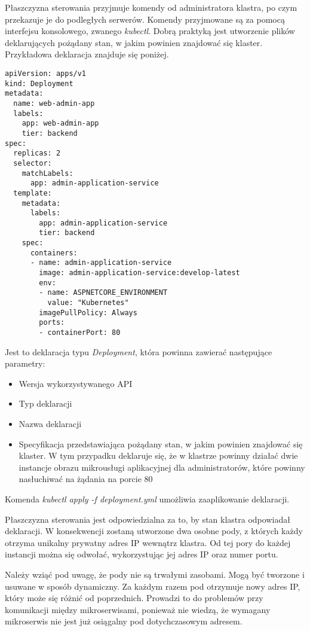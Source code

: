 Płaszczyzna sterowania przyjmuje komendy od administratora klastra, po czym przekazuje 
je do podległych serwerów. Komendy przyjmowane są za pomocą interfejsu 
konsolowego, zwanego \textit{kubectl}. Dobrą praktyką jest utworzenie plików deklarujących 
pożądany stan, w jakim powinien znajdować się klaster. Przykładowa deklaracja znajduje 
się poniżej.

\begin{lstlisting}
apiVersion: apps/v1
kind: Deployment
metadata:
  name: web-admin-app
  labels:
    app: web-admin-app
    tier: backend
spec:
  replicas: 2
  selector:
    matchLabels:
      app: admin-application-service
  template:
    metadata:
      labels:
        app: admin-application-service
        tier: backend
    spec:
      containers:
      - name: admin-application-service
        image: admin-application-service:develop-latest
        env:
        - name: ASPNETCORE_ENVIRONMENT
          value: "Kubernetes"
        imagePullPolicy: Always
        ports:
        - containerPort: 80
\end{lstlisting}

Jest to deklaracja typu \textit{Deployment}, która powinna zawierać następujące parametry:

\begin{itemize} %
    \item Wersja wykorzystywanego API
    \item Typ deklaracji
    \item Nazwa deklaracji
    \item Specyfikacja przedstawiająca pożądany stan, w jakim powinien znajdować się 
    klaster. W tym przypadku deklaruje się, że w klastrze powinny działać dwie 
    instancje obrazu mikrousługi aplikacyjnej dla administratorów, które powinny 
    nasłuchiwać na żądania na porcie 80
\end{itemize}

Komenda \textit{kubectl apply -f deployment.yml} umożliwia zaaplikowanie deklaracji.

Płaszczyzna sterowania jest odpowiedzialna za to, by stan klastra odpowiadał 
deklaracji. W konsekwencji zostaną utworzone dwa osobne pody, z których każdy otrzyma 
unikalny prywatny adres IP wewnątrz klastra. Od tej pory do każdej instancji można 
się odwołać, wykorzystując jej adres IP oraz numer portu.

Należy wziąć pod uwagę, że pody nie są trwałymi zasobami. Mogą być tworzone i usuwane 
w sposób dynamiczny. Za każdym razem pod otrzymuje nowy adres IP, który może się 
różnić od poprzednich. Prowadzi to do problemów przy komunikacji między 
mikroserwisami, ponieważ nie wiedzą, że wymagany mikroserwis nie jest już osiągalny pod 
dotychczasowym adresem.

